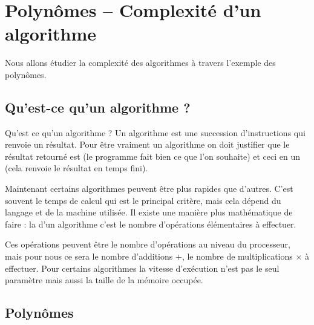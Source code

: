 \documentclass[class=report,crop=false]{standalone}
\begin{document}
\section{Polynômes -- Complexité d'un algorithme}

Nous allons étudier la complexité des algorithmes à travers l'exemple des polynômes.


\subsection{Qu'est-ce qu'un algorithme ?}

Qu'est ce qu'un algorithme ?
Un algorithme est une succession d'instructions qui renvoie un résultat. Pour être vraiment un algorithme on doit
justifier que le résultat retourné est  (le programme fait bien ce que l'on souhaite)
et ceci en un  (cela renvoie le résultat en temps fini).


Maintenant certains algorithmes peuvent être plus rapides que d'autres. C'est souvent le temps de calcul qui est le
principal critère, mais cela dépend du langage et de la machine utilisée. Il existe une manière plus mathématique de faire :
la  d'un algorithme c'est le nombre d'opérations élémentaires à effectuer.

Ces opérations peuvent être le nombre d'opérations au niveau du processeur, mais pour nous
ce sera le nombre d'additions $+$, le nombre de multiplications $\times$ à effectuer.
Pour certains algorithmes la vitesse d’exécution n'est pas le seul paramètre mais aussi la taille
de la mémoire occupée.


\subsection{Polynômes}
\end{document}
